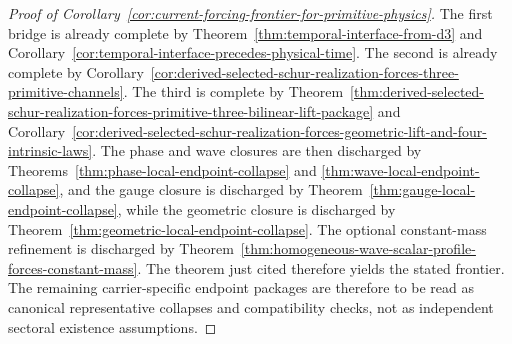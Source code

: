 \begin{proof}[Proof of Corollary~\ref{cor:current-forcing-frontier-for-primitive-physics}]
\label{proof:cor:current-forcing-frontier-for-primitive-physics}
The first bridge is already complete by
Theorem~\ref{thm:temporal-interface-from-d3} and
Corollary~\ref{cor:temporal-interface-precedes-physical-time}. The second is
already complete by
Corollary~\ref{cor:derived-selected-schur-realization-forces-three-primitive-channels}.
The third is complete by
Theorem~\ref{thm:derived-selected-schur-realization-forces-primitive-three-bilinear-lift-package}
and
Corollary~\ref{cor:derived-selected-schur-realization-forces-geometric-lift-and-four-intrinsic-laws}.
The phase and wave closures are then discharged by
Theorems~\ref{thm:phase-local-endpoint-collapse} and
\ref{thm:wave-local-endpoint-collapse}, and the gauge closure is discharged by
Theorem~\ref{thm:gauge-local-endpoint-collapse}, while the geometric closure is
discharged by Theorem~\ref{thm:geometric-local-endpoint-collapse}. The optional
constant-mass refinement is discharged by
Theorem~\ref{thm:homogeneous-wave-scalar-profile-forces-constant-mass}. The
theorem just cited therefore yields the stated frontier. The remaining
carrier-specific endpoint packages are therefore to be read as canonical
representative collapses and compatibility checks, not as independent sectoral
existence assumptions.
\end{proof}

